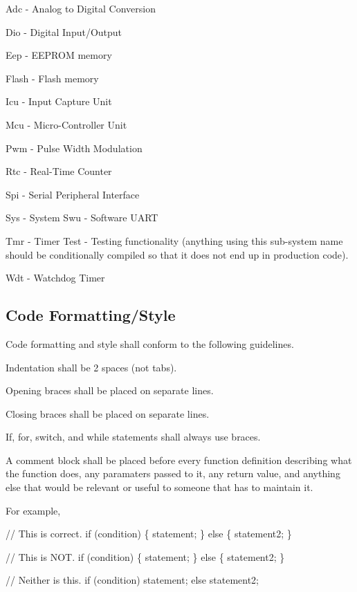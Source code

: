 Adc -\/ Analog to Digital Conversion \par
 Dio -\/ Digital Input/\-Output \par
 Eep -\/ E\-E\-P\-R\-O\-M memory \par
 Flash -\/ Flash memory \par
 Icu -\/ Input Capture Unit \par
 Mcu -\/ Micro-\/\-Controller Unit \par
 Pwm -\/ Pulse Width Modulation \par
 Rtc -\/ Real-\/\-Time Counter \par
 Spi -\/ Serial Peripheral Interface \par
 Sys -\/ System Swu -\/ Software U\-A\-R\-T \par
 Tmr -\/ Timer Test -\/ Testing functionality (anything using this sub-\/system name should be conditionally compiled so that it does not end up in production code). \par
 Wdt -\/ Watchdog Timer \par
\hypertarget{index_CF}{}\subsection{Code Formatting/\-Style}\label{index_CF}
Code formatting and style shall conform to the following guidelines.


\begin{DoxyItemize}
\item Indentation shall be 2 spaces (not tabs).
\item Opening braces shall be placed on separate lines.
\item Closing braces shall be placed on separate lines.
\item If, for, switch, and while statements shall always use braces.
\item A comment block shall be placed before every function definition describing what the function does, any paramaters passed to it, any return value, and anything else that would be relevant or useful to someone that has to maintain it.
\end{DoxyItemize}

For example, \par
 
\begin{DoxyCode}
\textcolor{comment}{// This is correct. }
\textcolor{keywordflow}{if} (condition) 
\{ 
  statement; 
\} 
\textcolor{keywordflow}{else} 
\{ 
  statement2; 
\} 

\textcolor{comment}{// This is NOT.}
\textcolor{keywordflow}{if} (condition) \{ 
  statement;     
\} \textcolor{keywordflow}{else} \{        
  statement2;       
\}               

\textcolor{comment}{// Neither is this.}
\textcolor{keywordflow}{if} (condition) 
  statement; 
\textcolor{keywordflow}{else}        
  statement2; 
\end{DoxyCode}



